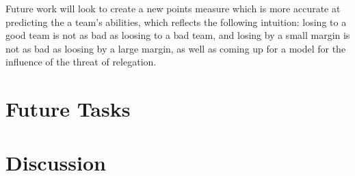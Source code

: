 \documentclass[conference]{IEEEtran}
\begin{document}
Future work will look to create a new points measure which is more accurate at predicting the a team's abilities, which reflects the following intuition: losing to a good team is not as bad as loosing to a bad team, and losing by a small margin is not as bad as loosing by a large margin, as well as coming up for a model for the influence of the threat of relegation. 

\section{Future Tasks}

\section{Discussion}

\nocite{*}


\clearpage

%
%
%
%




\end{document}
